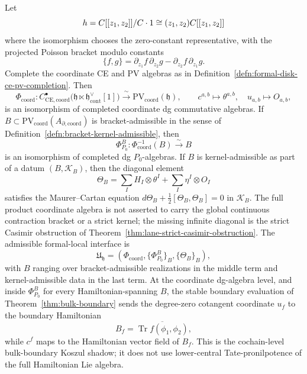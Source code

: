 \begin{thm}\label{thm:formal-disk-completed-ce-pv}
  Let
  \[
    h=C[[z_1,z_2]]/C\cdot1
      \cong (z_1,z_2)C[[z_1,z_2]]
  \]
  where the isomorphism chooses the zero-constant representative, with
  the projected Poisson bracket modulo constants
  \[
    \{f,g\}=\partial_{z_1}f\,\partial_{z_2}g
      -\partial_{z_2}f\,\partial_{z_1}g .
  \]
  Complete the coordinate CE and PV algebras as in
  Definition~\ref{defn:formal-disk-ce-pv-completion}.  Then
  \[
	    \Phi_{\mathrm{coord}}\colon
	    C^\bullet_{\mathrm{CE},\mathrm{coord}}
	    \bigl(\mathfrak h\ltimes\mathfrak h^\vee_{\mathrm{cont}}[1]\bigr)
    \xrightarrow{\ \sim\ }
    \mathrm{PV}_{\mathrm{coord}}(\mathfrak h),
    \qquad
    c^{a,b}\mapsto\theta^{a,b},\quad u_{a,b}\mapsto O_{a,b},
	  \]
	  is an isomorphism of completed coordinate dg commutative algebras.
	  If \(B\subset
	  \mathrm{PV}_{\mathrm{coord}}(A_{\partial,\mathrm{coord}})\) is
	  bracket-admissible in the sense of
	  Definition~\ref{defn:bracket-kernel-admissible}, then
	  \[
	    \Phi^B_{P_0}\colon\Phi_{\mathrm{coord}}^{-1}(B)
	    \xrightarrow{\sim}B
	  \]
	  is an isomorphism of completed dg \(P_0\)-algebras.  If \(B\) is
	  kernel-admissible as part of a datum \((B,\mathcal K_B)\), then the
	  diagonal element
	  \[
	    \Theta_B=\sum_I H_I\otimes\theta^I+\sum_I\eta^I\otimes O_I
	  \]
	  satisfies the Maurer--Cartan equation
	  \(d\Theta_B+\frac12[\Theta_B,\Theta_B]=0\) in \(\mathcal K_B\).  The
	  full product
	  coordinate algebra is not asserted to carry the global continuous
	  contraction bracket or a strict kernel; the missing infinite diagonal
	  is the strict Casimir obstruction of
	  Theorem~\ref{thm:lane-strict-casimir-obstruction}.  The admissible
	  formal-local interface is
	  \[
	    \mathfrak U_{\mathfrak h}
	    =(\Phi_{\mathrm{coord}},\{\Phi^B_{P_0}\}_B,\{\Theta_B\}_B),
	  \]
	  with \(B\) ranging over bracket-admissible realizations in the middle
	  term and kernel-admissible data in the last term.  At the coordinate
	  dg-algebra level, and inside \(\Phi^B_{P_0}\) for every
	  Hamiltonian-spanning \(B\), the stable boundary evaluation of
	  Theorem~\ref{thm:bulk-boundary} sends the degree-zero cotangent
	  coordinate \(u_f\) to the boundary Hamiltonian
  \[
    B_f=\overline{\operatorname{Tr}f(\phi_1,\phi_2)} ,
  \]
  while \(c^f\) maps to the Hamiltonian vector field of \(B_f\).  This
  is the cochain-level bulk-boundary Koszul shadow; it does not use
  lower-central Tate-pronilpotence of the full Hamiltonian Lie algebra.
\end{thm}


